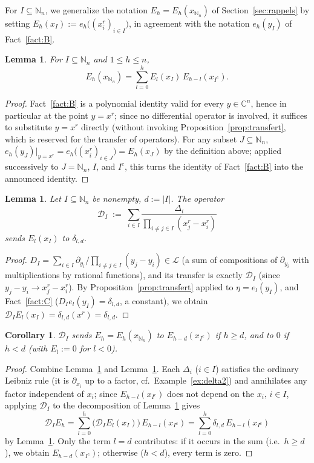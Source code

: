 \documentclass[10pt,a4paper]{amsart}
\newtheorem{lemma}[theorem]{Lemma}
\newtheorem{corollary}[theorem]{Corollary}
\newcommand{\NN}{\mathbb{N}}
\newcommand{\CC}{\mathbb{C}}
\begin{document}
For $I\subseteq\NN_n$, we generalize the notation $E_h=E_h(x_{\NN_n})$ of Section~\ref{sec:rappels} by setting $E_h(x_I):=e_h\big((x_i^r)_{i\in I}\big)$, in agreement with the notation $e_h(y_I)$ of Fact~\ref{fact:B}.

\begin{lemma}\label{lem:lem2}
For $I\subseteq\NN_n$ and $1\le h\le n$,
\[
E_h(x_{\NN_n}) = \sum_{l=0}^h E_l(x_I)\,E_{h-l}(x_{I^c}).
\]
\end{lemma}

\begin{proof}
Fact~\ref{fact:B} is a polynomial identity valid for every $y\in\CC^n$, hence in particular at the point $y=x^r$; since no differential operator is involved, it suffices to substitute $y=x^r$ directly (without invoking Proposition~\ref{prop:transfert}, which is reserved for the transfer of operators). For any subset $J\subseteq\NN_n$, $e_h(y_J)|_{y=x^r}=e_h\big((x_i^r)_{i\in J}\big)=E_h(x_J)$ by the definition above; applied successively to $J=\NN_n$, $I$, and $I^c$, this turns the identity of Fact~\ref{fact:B} into the announced identity.
\end{proof}

\begin{lemma}\label{lem:lem3}
Let $I\subseteq\NN_n$ be nonempty, $d:=|I|$. The operator
\[
\mathcal D_I \;:=\; \sum_{i\in I} \frac{\Delta_i}{\displaystyle\prod_{i\neq j\in I}(x_j^r-x_i^r)}
\]
sends $E_l(x_I)$ to $\delta_{l,d}$.
\end{lemma}

\begin{proof}
$D_I=\sum_{i\in I}\partial_{y_i}/\prod_{i\ne j\in I}(y_j-y_i)\in\mathcal L$ (a sum of compositions of $\partial_{y_i}$ with multiplications by rational functions), and its transfer is exactly $\mathcal D_I$ (since $y_j-y_i\to x_j^r-x_i^r$). By Proposition~\ref{prop:transfert} applied to $\eta=e_l(y_I)$, and Fact~\ref{fact:C} ($D_Ie_l(y_I)=\delta_{l,d}$, a constant), we obtain $\mathcal D_I E_l(x_I) = \delta_{l,d}(x^r)=\delta_{l,d}$.
\end{proof}

\begin{corollary}\label{cor:cor4}
$\mathcal D_I$ sends $E_h=E_h(x_{\NN_n})$ to $E_{h-d}(x_{I^c})$ if $h\ge d$, and to $0$ if $h<d$ (with $E_l:=0$ for $l<0$).
\end{corollary}

\begin{proof}
Combine Lemma~\ref{lem:lem2} and Lemma~\ref{lem:lem3}. Each $\Delta_i$ ($i\in I$) satisfies the ordinary Leibniz rule (it is $\partial_{x_i}$ up to a factor, cf.\ Example~\ref{ex:delta2}) and annihilates any factor independent of $x_i$; since $E_{h-l}(x_{I^c})$ does not depend on the $x_i,\,i\in I$, applying $\mathcal D_I$ to the decomposition of Lemma~\ref{lem:lem2} gives
\[
\mathcal D_I E_h = \sum_{l=0}^h \big(\mathcal D_I E_l(x_I)\big)\,E_{h-l}(x_{I^c}) = \sum_{l=0}^h \delta_{l,d}\,E_{h-l}(x_{I^c})
\]
by Lemma~\ref{lem:lem3}. Only the term $l=d$ contributes: if it occurs in the sum (i.e.\ $h\ge d$), we obtain $E_{h-d}(x_{I^c})$; otherwise ($h<d$), every term is zero.
\end{proof}
\end{document}
